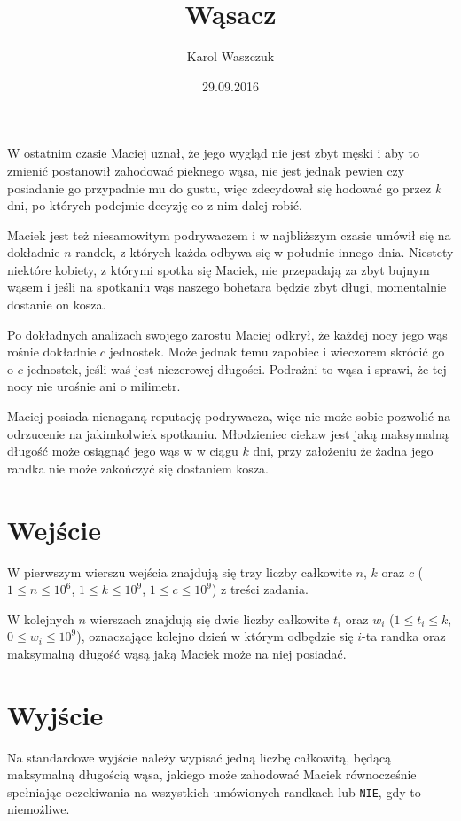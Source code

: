 \documentclass[zad,zawodnik,utf8]{sinol}
\title{Wąsacz}
\author{Karol Waszczuk} %
\date{29.09.2016}
\begin{document}
\begin{tasktext}%

W ostatnim czasie Maciej uznał, że jego wygląd nie jest zbyt męski i aby to zmienić postanowił zahodować pieknego wąsa, nie jest jednak pewien czy posiadanie go przypadnie mu do gustu, więc zdecydował się hodować go przez $k$ dni, po których podejmie decyzję co z nim dalej robić.

Maciek jest też niesamowitym podrywaczem i w najbliższym czasie umówił się na dokładnie $n$ randek, z których każda odbywa się w południe innego dnia. Niestety niektóre kobiety, z którymi spotka się Maciek, nie przepadają za zbyt bujnym wąsem i jeśli na spotkaniu wąs naszego bohetara będzie zbyt długi, momentalnie dostanie on kosza. 

Po dokładnych analizach swojego zarostu Maciej odkrył, że każdej nocy jego wąs rośnie dokładnie $c$ jednostek. Może jednak temu zapobiec i wieczorem skrócić go o $c$ jednostek, jeśli waś jest niezerowej długości. Podrażni to wąsa i sprawi, że tej nocy nie urośnie ani o milimetr. 

Maciej posiada nienaganą reputację podrywacza, więc nie może sobie pozwolić na odrzucenie na jakimkolwiek spotkaniu. Młodzieniec ciekaw jest jaką maksymalną długość może osiągnąć jego wąs w w ciągu $k$ dni, przy założeniu że żadna jego randka nie może zakończyć się dostaniem kosza. 

  \section{Wejście}
W pierwszym wierszu wejścia znajdują się trzy liczby całkowite $n$, $k$ oraz $c$ ($1 \leq n \leq 10^6$, $1 \leq k \leq 10^9$, $1 \leq c \leq 10^9$) z treści zadania.

W kolejnych $n$ wierszach znajdują się dwie liczby całkowite $t_i$ oraz $w_i$ ($1 \leq t_i \leq k$, $0 \leq w_i \leq 10^9$), oznaczające kolejno dzień w którym odbędzie się $i$-ta randka oraz maksymalną długość wąsą jaką Maciek może na niej posiadać.

  \section{Wyjście}
Na standardowe wyjście należy wypisać jedną liczbę całkowitą, będącą maksymalną długością wąsa, jakiego może zahodować Maciek równocześnie spełniając oczekiwania na wszystkich umówionych randkach lub \texttt{NIE}, gdy to niemożliwe.
\makecompactexample 

\end{tasktext}
\end{document}
